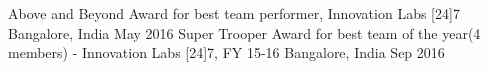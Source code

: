 \begin{cvhonors}
  \cvhonor
    {Above and Beyond}
    {Award for best team performer, Innovation Labs [24]7}
    {Bangalore, India}
    {May 2016}
  \cvhonor
    {Super Trooper}
    {Award for best team of the year(4 members) - Innovation Labs [24]7, FY 15-16}
    {Bangalore, India}
    {Sep 2016}
\end{cvhonors}